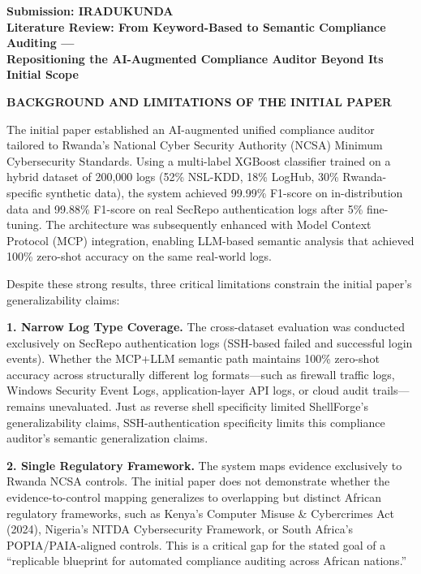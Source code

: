 \documentclass[12pt]{article}
\begin{document}
\begin{center}
\textbf{Submission: IRADUKUNDA}\\[0.5em]
\textbf{Literature Review: From Keyword-Based to Semantic Compliance Auditing ---}\\
\textbf{Repositioning the AI-Augmented Compliance Auditor Beyond Its Initial Scope}
\end{center}

\bigskip

\textbf{BACKGROUND AND LIMITATIONS OF THE INITIAL PAPER}

The initial paper established an AI-augmented unified compliance auditor tailored to Rwanda's National Cyber Security Authority (NCSA) Minimum Cybersecurity Standards. Using a multi-label XGBoost classifier trained on a hybrid dataset of 200,000 logs (52\% NSL-KDD, 18\% LogHub, 30\% Rwanda-specific synthetic data), the system achieved 99.99\% F1-score on in-distribution data and 99.88\% F1-score on real SecRepo authentication logs after 5\% fine-tuning. The architecture was subsequently enhanced with Model Context Protocol (MCP) integration, enabling LLM-based semantic analysis that achieved 100\% zero-shot accuracy on the same real-world logs.

Despite these strong results, three critical limitations constrain the initial paper's generalizability claims:

\textbf{1. Narrow Log Type Coverage.} The cross-dataset evaluation was conducted exclusively on SecRepo authentication logs (SSH-based failed and successful login events). Whether the MCP+LLM semantic path maintains 100\% zero-shot accuracy across structurally different log formats---such as firewall traffic logs, Windows Security Event Logs, application-layer API logs, or cloud audit trails---remains unevaluated. Just as reverse shell specificity limited ShellForge's generalizability claims, SSH-authentication specificity limits this compliance auditor's semantic generalization claims.

\textbf{2. Single Regulatory Framework.} The system maps evidence exclusively to Rwanda NCSA controls. The initial paper does not demonstrate whether the evidence-to-control mapping generalizes to overlapping but distinct African regulatory frameworks, such as Kenya's Computer Misuse \& Cybercrimes Act (2024), Nigeria's NITDA Cybersecurity Framework, or South Africa's POPIA/PAIA-aligned controls. This is a critical gap for the stated goal of a ``replicable blueprint for automated compliance auditing across African nations.''
\end{document}
